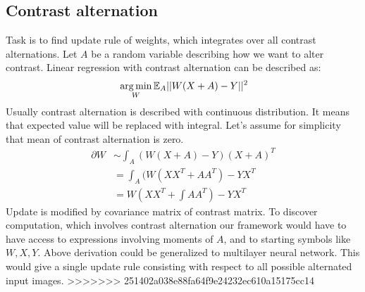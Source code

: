 \subsection{Contrast alternation}
Task is to find update rule of weights, which integrates over all contrast alternations.
Let $A$ be a random variable describing how we want to alter contrast. Linear regression
with contrast alternation can be described as: 
\begin{align*}
& \operatorname*{arg\,min}_{W} \mathbb{E}_A ||W(X + A) - Y||^2\\
\end{align*}
Usually contrast alternation is described with continuous distribution. It means that
expected value will be replaced with integral. Let's assume for simplicity that mean 
of contrast alternation is zero.
\begin{align*}
\partial W & \sim \int_A (W(X + A) - Y)(X + A)^T \\
   & = \int_A (W(XX^T + AA^T) - YX^T \\
   & = W(XX^T + \int AA^T) - YX^T 
\end{align*}
Update is modified by covariance matrix of contrast matrix. To discover computation,
which involves contrast alternation our framework would have to have access to 
expressions involving moments of $A$, and to starting symbols like $W, X, Y$.
Above derivation could be generalized to multilayer neural network. This would
give a single update rule consisting with respect to all possible alternated
input images.
>>>>>>> 251402a038e88fa64f9e24232ec610a15175cc14

